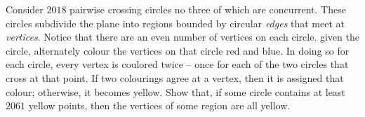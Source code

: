 Consider $2018$ pairwise crossing circles no three of which are concurrent. These circles subdivide the plane into regions bounded by circular \textit{edges} that meet at \textit{vertices}. Notice that there are an even number of vertices on each circle. given the circle, alternately colour the vertices on that circle red and blue. In doing so for each circle, every vertex is coulored twice -- once for each of the two circles that cross at that point. If two colourings agree at a vertex, then it is assigned that colour; otherwise, it becomes yellow. Show that, if some circle contains at least $2061$ yellow points, then the vertices of some region are all yellow.